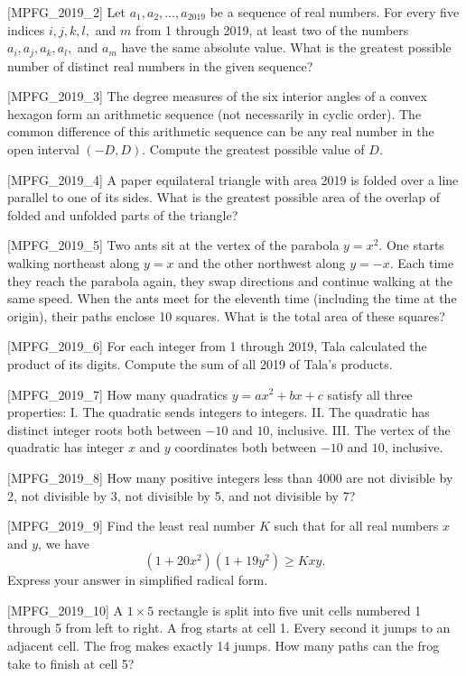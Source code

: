 [MPFG_2019_2]
Let $a_1, a_2, \dots, a_{2019}$ be a sequence of real numbers. For every five indices $i, j, k, l,$ and $m$ from 1 through 2019, at least two of the numbers $a_i, a_j, a_k, a_l,$ and $a_m$ have the same absolute value. What is the greatest possible number of distinct real numbers in the given sequence?

[MPFG_2019_3]
The degree measures of the six interior angles of a convex hexagon form an arithmetic sequence (not necessarily in cyclic order). The common difference of this arithmetic sequence can be any real number in the open interval $(-D, D)$. Compute the greatest possible value of $D$.

[MPFG_2019_4]
A paper equilateral triangle with area 2019 is folded over a line parallel to one of its sides. What is the greatest possible area of the overlap of folded and unfolded parts of the triangle?

[MPFG_2019_5]
Two ants sit at the vertex of the parabola $y=x^2$. One starts walking northeast along $y=x$ and the other northwest along $y=-x$. Each time they reach the parabola again, they swap directions and continue walking at the same speed. When the ants meet for the eleventh time (including the time at the origin), their paths enclose 10 squares. What is the total area of these squares?

[MPFG_2019_6]
For each integer from 1 through 2019, Tala calculated the product of its digits. Compute the sum of all 2019 of Tala's products.

[MPFG_2019_7]
How many quadratics $y = ax^2 + bx + c$ satisfy all three properties:
I. The quadratic sends integers to integers.
II. The quadratic has distinct integer roots both between $-10$ and $10$, inclusive.
III. The vertex of the quadratic has integer $x$ and $y$ coordinates both between $-10$ and $10$, inclusive.

[MPFG_2019_8]
How many positive integers less than 4000 are not divisible by 2, not divisible by 3, not divisible by 5, and not divisible by 7?

[MPFG_2019_9]
Find the least real number $K$ such that for all real numbers $x$ and $y$, we have
$$(1 + 20x^2)(1 + 19y^2) \ge Kxy.$$
Express your answer in simplified radical form.

[MPFG_2019_10]
A $1 \times 5$ rectangle is split into five unit cells numbered 1 through 5 from left to right. A frog starts at cell 1. Every second it jumps to an adjacent cell. The frog makes exactly 14 jumps. How many paths can the frog take to finish at cell 5?

